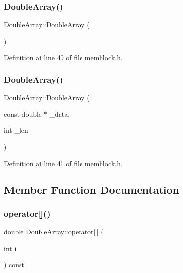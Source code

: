 \subsubsection{\texorpdfstring{Double\+Array()}{DoubleArray()}\hspace{0.1cm}{\footnotesize\ttfamily [1/2]}}
{\footnotesize\ttfamily Double\+Array\+::\+Double\+Array (\begin{DoxyParamCaption}{ }\end{DoxyParamCaption})\hspace{0.3cm}{\ttfamily [inline]}}



Definition at line 40 of file memblock.\+h.

\mbox{\label{class_double_array_a7f0f4d9ff32906c63cdc010285ca7395}} 
\subsubsection{\texorpdfstring{Double\+Array()}{DoubleArray()}\hspace{0.1cm}{\footnotesize\ttfamily [2/2]}}
{\footnotesize\ttfamily Double\+Array\+::\+Double\+Array (\begin{DoxyParamCaption}\item[{const double $\ast$}]{\+\_\+data,  }\item[{int}]{\+\_\+len }\end{DoxyParamCaption})\hspace{0.3cm}{\ttfamily [inline]}}



Definition at line 41 of file memblock.\+h.



\subsection{Member Function Documentation}
\mbox{\label{class_double_array_acb83f11d843327f229a970f9b30f4943}} 
\subsubsection{\texorpdfstring{operator[]()}{operator[]()}}
{\footnotesize\ttfamily double Double\+Array\+::operator\mbox{[}$\,$\mbox{]} (\begin{DoxyParamCaption}\item[{int}]{i }\end{DoxyParamCaption}) const\hspace{0.3cm}{\ttfamily [inline]}}



